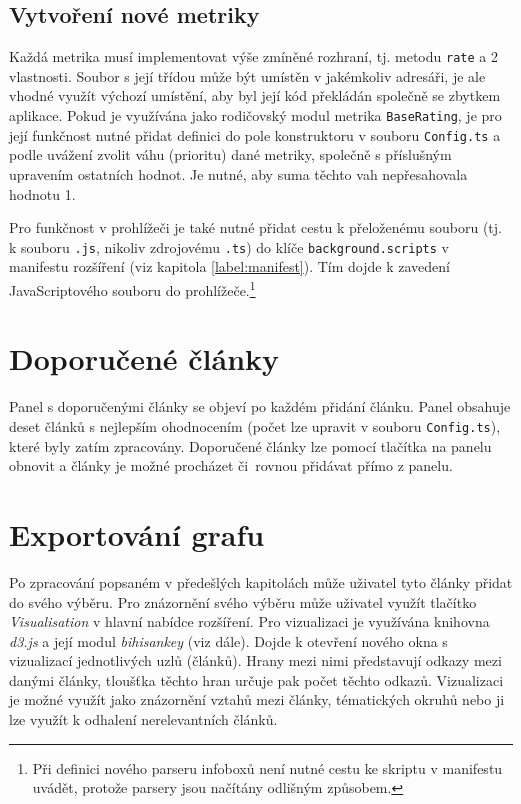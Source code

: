\subsection{Vytvoření nové metriky}
Každá metrika musí implementovat výše zmíněné rozhraní, tj. metodu \texttt{rate} a 2 vlastnosti. Soubor s její třídou může být umístěn v jakémkoliv adresáři, je ale vhodné využít výchozí umístění, aby byl její kód překládán společně se zbytkem aplikace. Pokud je využívána jako rodičovský modul metrika \texttt{BaseRating}, je pro její funkčnost nutné přidat definici do pole konstruktoru v souboru \texttt{Config.ts} a podle uvážení zvolit váhu (prioritu) dané metriky, společně s příslušným upravením ostatních hodnot. Je nutné, aby suma těchto vah nepřesahovala hodnotu 1.

Pro funkčnost v prohlížeči je také nutné přidat cestu k přeloženému souboru (tj. k souboru \texttt{.js}, nikoliv zdrojovému \texttt{.ts}) do klíče \texttt{background.scripts} v manifestu rozšíření (viz kapitola \ref{label:manifest}). Tím dojde k zavedení JavaScriptového souboru do prohlížeče.\footnote{Při definici nového parseru infoboxů není nutné cestu ke skriptu v manifestu uvádět, protože parsery jsou načítány odlišným způsobem.} 

\section{Doporučené články}
Panel s doporučenými články se objeví po každém přidání článku. Panel obsahuje deset článků s nejlepším ohodnocením (počet lze upravit v souboru \texttt{Config.ts}), které byly zatím zpracovány. Doporučené články lze pomocí tlačítka na panelu obnovit a články je možné procházet či~rovnou přidávat přímo z panelu.

\section{Exportování grafu}
Po zpracování popsaném v předešlých kapitolách může uživatel tyto články přidat do svého výběru. Pro znázornění svého výběru může uživatel využít tlačítko \textit{Visualisation} v hlavní nabídce rozšíření. Pro vizualizaci je využívána knihovna \textit{d3.js} a její modul \textit{bihisankey} (viz dále). Dojde k otevření nového okna s vizualizací jednotlivých uzlů (článků). Hrany mezi nimi představují odkazy mezi danými články, tloušťka těchto hran určuje pak počet těchto odkazů. Vizualizaci je možné využít jako znázornění vztahů mezi články, tématických okruhů nebo ji lze využít k odhalení nerelevantních článků.

